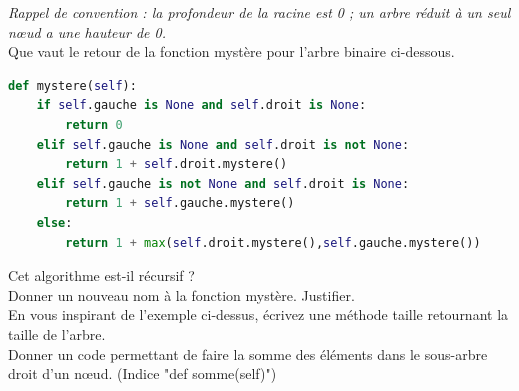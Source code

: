 
\begin{Exercise}[title={Code mystère}]

    \textit{Rappel de convention : la profondeur de la racine est 0 ; un arbre réduit à un seul nœud a une hauteur de 0.}\\[1ex]

    \Question Que vaut le retour de la fonction mystère pour l'arbre binaire ci-dessous.\\
    \begin{center}
        
    \end{center}
    \begin{lstlisting}[style=pythonstyle, language=Python]
def mystere(self):
    if self.gauche is None and self.droit is None:
        return 0
    elif self.gauche is None and self.droit is not None:
        return 1 + self.droit.mystere()
    elif self.gauche is not None and self.droit is None:
        return 1 + self.gauche.mystere()
    else:
        return 1 + max(self.droit.mystere(),self.gauche.mystere())
    \end{lstlisting}

    \Question Cet algorithme est-il récursif ?\\
\emptybox{1cm}
    \Question Donner un nouveau nom à la fonction mystère. Justifier. \\
    \emptybox{3cm}
    \Question En vous inspirant de l'exemple ci-dessus, écrivez une méthode taille retournant la taille de l'arbre. \\
    \emptybox{8cm}
    \Question Donner un code permettant de faire la somme des éléments dans le sous-arbre droit d'un nœud. (Indice "def somme(self)")\\
    \emptybox{8cm}
\end{Exercise}
\pagebreak